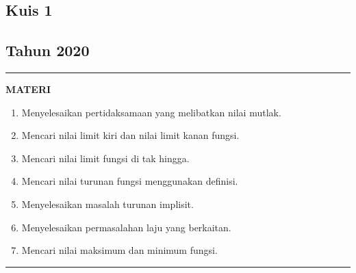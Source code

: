 \begin{flushright}
    \section*{\Large{Kuis 1}}
    \subsection*{Tahun 2020}
\end{flushright}


\vspace{0.5cm}\hrule height 2pt\vspace{0.5cm}


\begin{center}
\textbf{\large{MATERI}}
\begin{enumerate}[leftmargin=*, label={\arabic*}.]
\item Menyelesaikan pertidaksamaan yang melibatkan nilai mutlak.
\item Mencari nilai limit kiri dan nilai limit kanan fungsi.
\item Mencari nilai limit fungsi di tak hingga.
\item Mencari nilai turunan fungsi menggunakan definisi.
\item Menyelesaikan masalah turunan implisit.
\item Menyelesaikan permasalahan laju yang berkaitan.
\item Mencari nilai maksimum dan minimum fungsi.
\end{enumerate}
\end{center}


\vspace{0.2cm}\hrule height 1pt\vspace{0.5cm}



